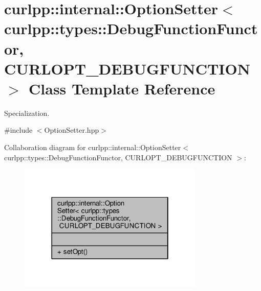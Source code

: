 \hypertarget{classcurlpp_1_1internal_1_1OptionSetter_3_01curlpp_1_1types_1_1DebugFunctionFunctor_00_01CURLOPT__DEBUGFUNCTION_01_4}{\section{curlpp\-:\-:internal\-:\-:Option\-Setter$<$ curlpp\-:\-:types\-:\-:Debug\-Function\-Functor, C\-U\-R\-L\-O\-P\-T\-\_\-\-D\-E\-B\-U\-G\-F\-U\-N\-C\-T\-I\-O\-N $>$ Class Template Reference}
\label{classcurlpp_1_1internal_1_1OptionSetter_3_01curlpp_1_1types_1_1DebugFunctionFunctor_00_01CURLOPT__DEBUGFUNCTION_01_4}
}


Specialization.  




{\ttfamily \#include $<$Option\-Setter.\-hpp$>$}



Collaboration diagram for curlpp\-:\-:internal\-:\-:Option\-Setter$<$ curlpp\-:\-:types\-:\-:Debug\-Function\-Functor, C\-U\-R\-L\-O\-P\-T\-\_\-\-D\-E\-B\-U\-G\-F\-U\-N\-C\-T\-I\-O\-N $>$\-:
\nopagebreak
\begin{figure}[H]
\begin{center}
\leavevmode
\includegraphics[width=250pt]{classcurlpp_1_1internal_1_1OptionSetter_3_01curlpp_1_1types_1_1DebugFunctionFunctor_00_01CURLOPT0cdc21ce315c04a5e720ab64149a961f}
\end{center}
\end{figure}
